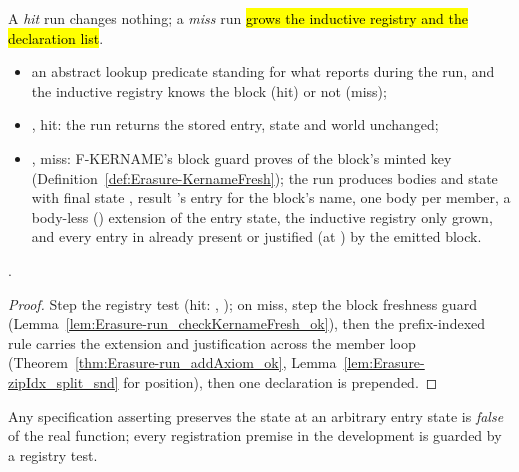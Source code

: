 \begin{theorem}
\label{thm:Erasure-run_register_inductive_cold_ok}
\leanok
{}
 A \emph{hit} run changes nothing; a \emph{miss} run \hl{grows the inductive registry
and the declaration list}.
\begin{itemize}
\item {} an abstract lookup predicate  standing for what 
reports during the run, and the inductive registry knows the block (hit) or not (miss);
\item {}, hit: the run returns the stored entry, state and world unchanged;
\item {}, miss: F-KERNAME's block guard proves  of the block's
minted key (Definition~\ref{def:Erasure-KernameFresh}); the run produces bodies  and
state  with final state , result 's entry for
the block's name, one body per member,  a body-less () extension of the
entry state, the inductive registry only grown, and every entry in  already present or
justified (at ) by the emitted block.
\end{itemize}
 \stProved{}.
\end{theorem}
\begin{proof}
\leanok
{}
 Step the registry test (hit: , ); on miss, step the block
freshness guard (Lemma~\ref{lem:Erasure-run_checkKernameFresh_ok}), then the prefix-indexed
 rule carries the extension and justification across the member loop
(Theorem~\ref{thm:Erasure-run_addAxiom_ok}, Lemma~\ref{lem:Erasure-zipIdx_split_snd} for position),
then one declaration is prepended.
\end{proof}

\begin{remark}
 Any specification asserting  preserves the state at an
arbitrary entry state is \emph{false} of the real function; every registration premise in the
development is guarded by a registry test.
\end{remark}

